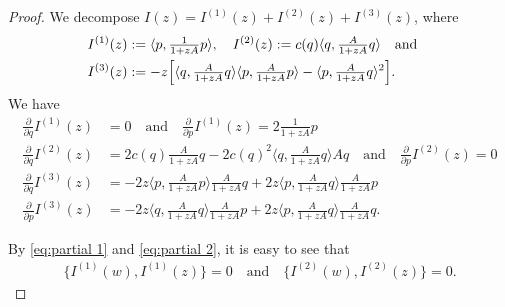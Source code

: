 \documentclass{amsart}
\newcommand{\qtq}[1]{\quad\text{#1}\quad}
\theoremstyle{definition}
\numberwithin{equation}{section}
\begin{document}
\begin{proof}
We decompose $I (z)=I^{(1)}(z)+I^{(2)}(z)+I^{(3)}(z)$, where
\begin{align*}
I^{(1)}(z)&:=\langle p,\tfrac{1}{1+zA}p\rangle, \quad  I^{(2)}(z) := c(q)\langle q,\tfrac{A}{1+zA}q\rangle \qtq{and} \\
I^{(3)}(z)& := -z\Bigl[\langle q,\tfrac{A}{1+zA}q\rangle\langle p,\tfrac{A}{1+zA}p\rangle-\langle p,\tfrac{A}{1+zA}q\rangle^2\Bigr].
\end{align*}
We have 
\begin{align}
\tfrac{\partial}{\partial q} I^{(1)} (z)&= 0 \qtq{and} \tfrac{\partial}{\partial p} I^{(1)} (z)= 2 \tfrac{1}{1+zA}p \label{eq:partial 1} \\
\tfrac{\partial}{\partial q} I^{(2)} (z)&= 2 c(q)  \tfrac{A}{1+zA}q - 2 c(q)^2\langle q, \tfrac{A}{1+zA}q\rangle Aq \qtq{and} \tfrac{\partial}{\partial p} I^{(2)}(z) = 0\label{eq:partial 2}\\
\tfrac{\partial}{\partial q} I^{(3)} (z)&= -2z\langle p, \tfrac{A}{1+zA}p\rangle  \tfrac{A}{1+zA}q +2z \langle p, \tfrac{A}{1+zA}q\rangle  \tfrac{A}{1+zA}p \label{eq:partial 3}\\
\tfrac{\partial}{\partial p} I^{(3)}(z) &= -2z\langle q, \tfrac{A}{1+zA}q\rangle  \tfrac{A}{1+zA}p +2z \langle p, \tfrac{A}{1+zA}q\rangle  \tfrac{A}{1+zA}q. \label{eq:partial 4}
\end{align}

By \eqref{eq:partial 1} and \eqref{eq:partial 2}, it is easy to see that
\begin{align}\label{eq:poisson_commutativity 1}
\{I^{(1)}(w),I ^{(1)}(z) \}=0 \qtq{and} \{I^{(2)}(w),I ^{(2)}(z) \}=0.
\end{align}


\end{proof}
\end{document}
